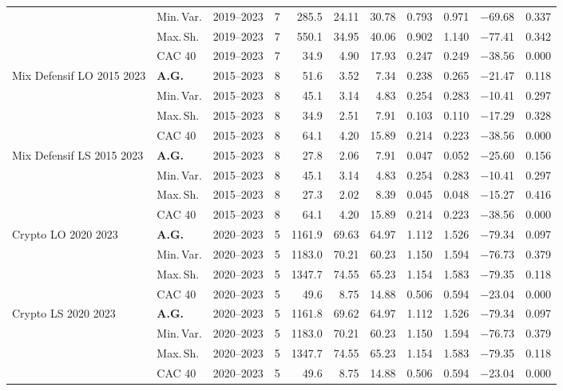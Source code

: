 \begin{longtable}{p{2.6cm} l c c r r r r r r r}
 & Min.\,Var. & 2019--2023 & 7 & 285.5 & 24.11 & 30.78 & 0.793 & 0.971 & $-$69.68 & 0.337 \\
 & Max.\,Sh. & 2019--2023 & 7 & 550.1 & 34.95 & 40.06 & 0.902 & 1.140 & $-$77.41 & 0.342 \\
 & CAC 40 & 2019--2023 & 7 & 34.9 & 4.90 & 17.93 & 0.247 & 0.249 & $-$38.56 & 0.000 \\
\midrule
Mix Defensif LO 2015 2023 & \textbf{A.G.} & 2015--2023 & 8 & 51.6 & 3.52 & 7.34 & 0.238 & 0.265 & $-$21.47 & 0.118 \\
 & Min.\,Var. & 2015--2023 & 8 & 45.1 & 3.14 & 4.83 & 0.254 & 0.283 & $-$10.41 & 0.297 \\
 & Max.\,Sh. & 2015--2023 & 8 & 34.9 & 2.51 & 7.91 & 0.103 & 0.110 & $-$17.29 & 0.328 \\
 & CAC 40 & 2015--2023 & 8 & 64.1 & 4.20 & 15.89 & 0.214 & 0.223 & $-$38.56 & 0.000 \\
\midrule
Mix Defensif LS 2015 2023 & \textbf{A.G.} & 2015--2023 & 8 & 27.8 & 2.06 & 7.91 & 0.047 & 0.052 & $-$25.60 & 0.156 \\
 & Min.\,Var. & 2015--2023 & 8 & 45.1 & 3.14 & 4.83 & 0.254 & 0.283 & $-$10.41 & 0.297 \\
 & Max.\,Sh. & 2015--2023 & 8 & 27.3 & 2.02 & 8.39 & 0.045 & 0.048 & $-$15.27 & 0.416 \\
 & CAC 40 & 2015--2023 & 8 & 64.1 & 4.20 & 15.89 & 0.214 & 0.223 & $-$38.56 & 0.000 \\
\midrule
Crypto LO 2020 2023 & \textbf{A.G.} & 2020--2023 & 5 & 1161.9 & 69.63 & 64.97 & 1.112 & 1.526 & $-$79.34 & 0.097 \\
 & Min.\,Var. & 2020--2023 & 5 & 1183.0 & 70.21 & 60.23 & 1.150 & 1.594 & $-$76.73 & 0.379 \\
 & Max.\,Sh. & 2020--2023 & 5 & 1347.7 & 74.55 & 65.23 & 1.154 & 1.583 & $-$79.35 & 0.118 \\
 & CAC 40 & 2020--2023 & 5 & 49.6 & 8.75 & 14.88 & 0.506 & 0.594 & $-$23.04 & 0.000 \\
\midrule
Crypto LS 2020 2023 & \textbf{A.G.} & 2020--2023 & 5 & 1161.8 & 69.62 & 64.97 & 1.112 & 1.526 & $-$79.34 & 0.097 \\
 & Min.\,Var. & 2020--2023 & 5 & 1183.0 & 70.21 & 60.23 & 1.150 & 1.594 & $-$76.73 & 0.379 \\
 & Max.\,Sh. & 2020--2023 & 5 & 1347.7 & 74.55 & 65.23 & 1.154 & 1.583 & $-$79.35 & 0.118 \\
 & CAC 40 & 2020--2023 & 5 & 49.6 & 8.75 & 14.88 & 0.506 & 0.594 & $-$23.04 & 0.000 \\

\end{longtable}
